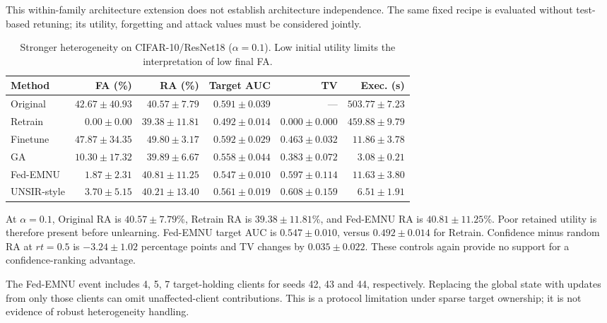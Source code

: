 \documentclass[software,article,submit,moreauthors]{Definitions/mdpi}
\begin{document}
This within-family architecture extension does not establish architecture independence. The same fixed recipe is evaluated without test-based retuning; its utility, forgetting and attack values must be considered jointly.

\begin{table}[H]
\caption{Stronger heterogeneity on CIFAR-10/ResNet18 ($\alpha=0.1$). Low initial utility limits the interpretation of low final FA.}
\label{tab:alpha01}
\centering\footnotesize\setlength{\tabcolsep}{3.5pt}
\begin{tabular}{lrrrrr}
\toprule
Method & FA (\%) & RA (\%) & Target AUC & TV & Exec. (s)\\
\midrule
Original & $42.67 \pm 40.93$ & $40.57 \pm 7.79$ & $0.591 \pm 0.039$ & --- & $503.77 \pm 7.23$\\
Retrain & $0.00 \pm 0.00$ & $39.38 \pm 11.81$ & $0.492 \pm 0.014$ & $0.000 \pm 0.000$ & $459.88 \pm 9.79$\\
Finetune & $47.87 \pm 34.35$ & $49.80 \pm 3.17$ & $0.592 \pm 0.029$ & $0.463 \pm 0.032$ & $11.86 \pm 3.78$\\
GA & $10.30 \pm 17.32$ & $39.89 \pm 6.67$ & $0.558 \pm 0.044$ & $0.383 \pm 0.072$ & $3.08 \pm 0.21$\\
Fed-EMNU & $1.87 \pm 2.31$ & $40.81 \pm 11.25$ & $0.547 \pm 0.010$ & $0.597 \pm 0.114$ & $11.63 \pm 3.80$\\
UNSIR-style & $3.70 \pm 5.15$ & $40.21 \pm 13.40$ & $0.561 \pm 0.019$ & $0.608 \pm 0.159$ & $6.51 \pm 1.91$\\
\bottomrule
\end{tabular}
\end{table}

At $\alpha=0.1$, Original RA is $40.57 \pm 7.79$\%, Retrain RA is $39.38 \pm 11.81$\%, and Fed-EMNU RA is $40.81 \pm 11.25$\%. Poor retained utility is therefore present before unlearning. Fed-EMNU target AUC is $0.547 \pm 0.010$, versus $0.492 \pm 0.014$ for Retrain. Confidence minus random RA at $rt=0.5$ is $-3.24 \pm 1.02$ percentage points and TV changes by $0.035 \pm 0.022$. These controls again provide no support for a confidence-ranking advantage.

The Fed-EMNU event includes 4, 5, 7 target-holding clients for seeds 42, 43 and 44, respectively. Replacing the global state with updates from only those clients can omit unaffected-client contributions. This is a protocol limitation under sparse target ownership; it is not evidence of robust heterogeneity handling.
\end{document}
